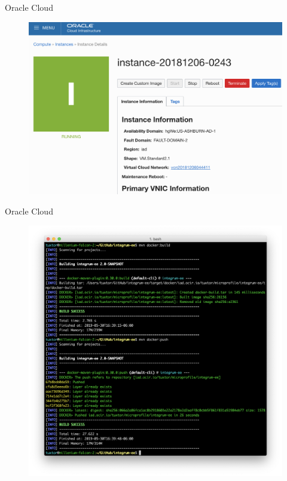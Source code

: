 \documentclass[aspectratio=169]{beamer}
\begin{document}
\begin{frame}{Oracle Cloud}
\begin{figure}
	\centering
	\includegraphics[width=0.95\linewidth]{Images/oc2}
\end{figure}
\end{frame}

\begin{frame}{Oracle Cloud}
\begin{figure}
	\centering
	\includegraphics[width=\linewidth]{Images/oc3}
\end{figure}
\end{frame}
\end{document}
